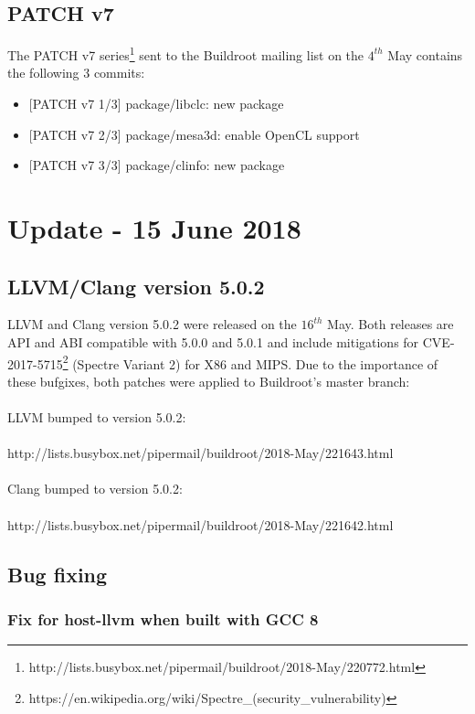 \documentclass[12pt,a4paper,oneside]{article}
\begin{document}
\subsection*{PATCH v7}
The PATCH v7 series\footnote{http://lists.busybox.net/pipermail/buildroot/2018-May/220772.html}
sent to the Buildroot mailing list on the $4^{th}$ May contains the following
3 commits:
\begin{itemize}
  \item {[PATCH v7 1/3]} package/libclc: new package
  \item {[PATCH v7 2/3]} package/mesa3d: enable OpenCL support
  \item {[PATCH v7 3/3]} package/clinfo: new package
\end{itemize}

\newpage
\section*{Update - 15 June 2018}

\subsection*{LLVM/Clang version 5.0.2}
LLVM and Clang version 5.0.2 were released on the $16^{th}$ May. Both releases are
API and ABI compatible with 5.0.0 and 5.0.1 and include mitigations for
CVE-2017-5715\footnote{https://en.wikipedia.org/wiki/Spectre\_(security\_vulnerability)}
(Spectre Variant 2) for X86 and MIPS. Due to the importance of these bufgixes,
both patches were applied to Buildroot's master branch:\\\\
LLVM bumped to version 5.0.2:\\\\
http://lists.busybox.net/pipermail/buildroot/2018-May/221643.html\\\\
Clang bumped to version 5.0.2:\\\\
http://lists.busybox.net/pipermail/buildroot/2018-May/221642.html

\subsection*{Bug fixing}

\subsubsection*{Fix for host-llvm when built with GCC 8}
\end{document}
